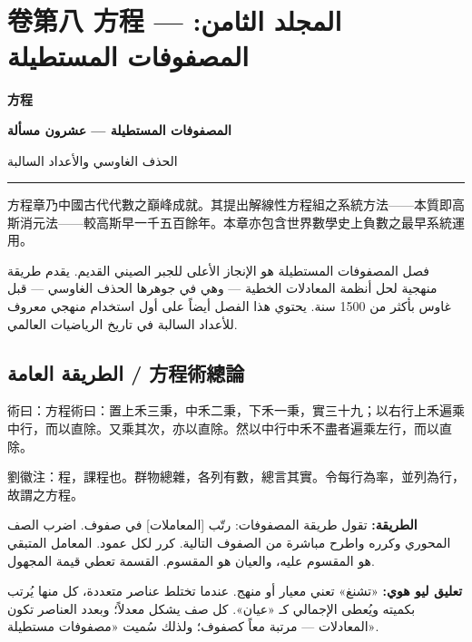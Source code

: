 \documentclass[11pt,a4paper]{article}
\newcommand{\ar}[1]{\arabicfont\beginR #1\endR}
\newcommand{\longline}{\noindent\rule{\textwidth}{0.4pt}}
\newcommand{\ChinCol}[1]{\begin{minipage}[t]{0.48\textwidth}#1\end{minipage}}
\newcommand{\ArabCol}[1]{\begin{minipage}[t]{0.48\textwidth}\arabicfont\beginR #1\endR\end{minipage}}
\newcommand{\parallelsection}[2]{%
  \noindent\ChinCol{#1}\hfill\ArabCol{#2}\par\vspace{0.5cm}%
}
\newcounter{probnum}
\begin{document}
\newpage

\setcounter{probnum}{0}

\section{卷第八 方程 --- \ar{المجلد الثامن: المصفوفات المستطيلة}}
\label{sec:vol8}

\begin{center}
{\Large\bfseries\color{volcolor} 方程}

\vspace{0.2cm}

{\fontsize{14}{18}\selectfont\arabicfont\beginR\color{volcolor}\textbf{المصفوفات المستطيلة --- عشرون مسألة}\endR}

\vspace{0.2cm}

{\small\color{notecolor}\arabicfont\beginR الحذف الغاوسي والأعداد السالبة\endR}
\end{center}

\vspace{0.3cm}
\longline
\vspace{0.3cm}

\parallelsection{%
方程章乃中國古代代數之巔峰成就。其提出解線性方程組之系統方法——本質即高斯消元法——較高斯早一千五百餘年。本章亦包含世界數學史上負數之最早系統運用。
}{%
فصل المصفوفات المستطيلة هو الإنجاز الأعلى للجبر الصيني القديم. يقدم طريقة منهجية لحل أنظمة المعادلات الخطية --- وهي في جوهرها الحذف الغاوسي --- قبل غاوس بأكثر من 1500 سنة. يحتوي هذا الفصل أيضاً على أول استخدام منهجي معروف للأعداد السالبة في تاريخ الرياضيات العالمي.
}

\subsection*{الطريقة العامة / 方程術總論}

\parallelsection{%
術曰：方程術曰：置上禾三秉，中禾二秉，下禾一秉，實三十九；以右行上禾遍乘中行，而以直除。又乘其次，亦以直除。然以中行中禾不盡者遍乘左行，而以直除。

劉徽注：程，課程也。群物總雜，各列有數，總言其實。令每行為率，並列為行，故謂之方程。
}{%
\textbf{الطريقة:} تقول طريقة المصفوفات: رتّب [المعاملات] في صفوف. اضرب الصف المحوري وكرره واطرح مباشرة من الصفوف التالية. كرر لكل عمود. المعامل المتبقي هو المقسوم عليه، والعيان هو المقسوم. القسمة تعطي قيمة المجهول.

\textbf{تعليق ليو هوي:} «تشنغ» تعني معيار أو منهج. عندما تختلط عناصر متعددة، كل منها يُرتب بكميته ويُعطى الإجمالي كـ «عيان». كل صف يشكل معدلاً؛ وبعدد العناصر تكون المعادلات --- مرتبة معاً كصفوف؛ ولذلك سُميت «مصفوفات مستطيلة».
}
\end{document}
